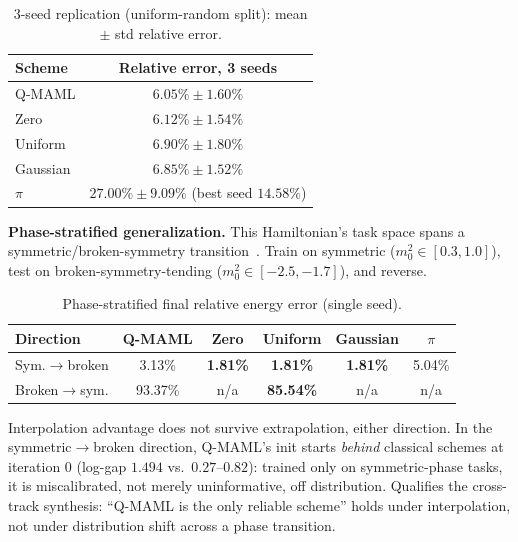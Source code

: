\documentclass[11pt]{article}
\begin{document}
\begin{table}[ht]
\centering
\caption{3-seed replication (uniform-random split): mean $\pm$ std relative error.}
\label{tab:scalar-seeds}
\begin{tabular}{lc}
\toprule
Scheme & Relative error, 3 seeds \\
\midrule
Q-MAML & $6.05\%\pm1.60\%$ \\
Zero & $6.12\%\pm1.54\%$ \\
Uniform & $6.90\%\pm1.80\%$ \\
Gaussian & $6.85\%\pm1.52\%$ \\
$\pi$ & $27.00\%\pm9.09\%$ (best seed $14.58\%$) \\
\bottomrule
\end{tabular}
\end{table}

\textbf{Phase-stratified generalization.} This Hamiltonian's task space spans a symmetric/broken-symmetry
transition~\citep{scalarfield2023}. Train on symmetric ($m_0^2\in[0.3,1.0]$), test on
broken-symmetry-tending ($m_0^2\in[-2.5,-1.7]$), and reverse.

\begin{table}[ht]
\centering
\caption{Phase-stratified final relative energy error (single seed).}
\label{tab:phase-stratified}
\begin{tabular}{p{}ccccc}
\toprule
Direction & Q-MAML & Zero & Uniform & Gaussian & $\pi$ \\
\midrule
Sym.$\to$broken & 3.13\% & \textbf{1.81\%} & \textbf{1.81\%} & \textbf{1.81\%} & 5.04\% \\
Broken$\to$sym. & 93.37\% & n/a & \textbf{85.54\%} & n/a & n/a \\
\bottomrule
\end{tabular}
\end{table}

Interpolation advantage does not survive extrapolation, either direction. In the symmetric$\to$broken
direction, Q-MAML's init starts \emph{behind} classical schemes at iteration 0 (log-gap $1.494$ vs.\
$0.27$--$0.82$): trained only on symmetric-phase tasks, it is miscalibrated, not merely uninformative, off
distribution. Qualifies the cross-track synthesis: ``Q-MAML is the only reliable scheme'' holds under
interpolation, not under distribution shift across a phase transition.
\end{document}

